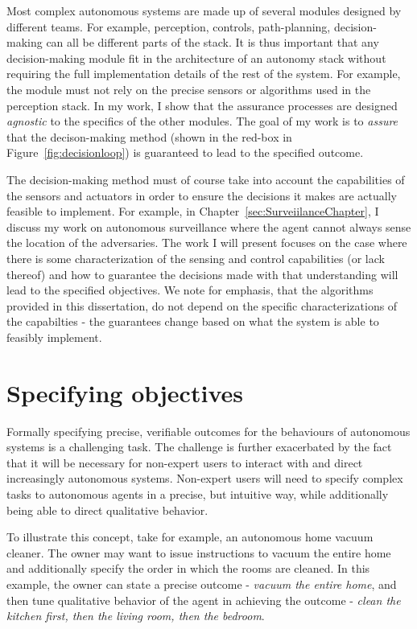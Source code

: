 Most complex autonomous systems are made up of several modules designed by different teams. For example, perception, controls, path-planning, decision-making can all be different parts of the stack. It is thus important that any decision-making module fit in the architecture of an autonomy stack without requiring the full implementation details of the rest of the system. For example, the module must not rely on the precise sensors or algorithms used in the perception stack. In my work, I show that the assurance processes are designed \emph{agnostic} to the specifics of the other modules. The goal of my work is to \emph{assure} that the decison-making method (shown in the red-box in Figure~\ref{fig:decisionloop}) is guaranteed to lead to the specified outcome.  

The decision-making method must of course take into account the capabilities of the sensors and actuators in order to ensure the decisions it makes are actually feasible to implement. For example, in Chapter~\ref{sec:SurveiilanceChapter}, I discuss my work on autonomous surveillance where the agent cannot always sense the location of the adversaries. The work I will present focuses on the case where there is some characterization of the sensing and control capabilities (or lack thereof) and how to guarantee the decisions made with that understanding will lead to the specified objectives. We note for emphasis, that the algorithms provided in this dissertation, do not depend on the specific characterizations of the capabilties - the guarantees change based on what the system is able to feasibly implement. 

\section{Specifying objectives}

Formally specifying precise, verifiable outcomes for the behaviours of autonomous systems is a challenging task. The challenge is further exacerbated by the fact that it will be necessary for non-expert users to interact with and direct increasingly autonomous systems. Non-expert users will need to specify complex tasks to autonomous agents in a precise, but intuitive way, while additionally being able to direct qualitative behavior. 

To illustrate this concept, take for example, an autonomous home vacuum cleaner. The owner may want to issue instructions to vacuum the entire home and additionally specify the order in which the rooms are cleaned. In this example, the owner can state a precise outcome - \emph{vacuum the entire home}, and then tune qualitative behavior of the agent in achieving the outcome - \emph{clean the kitchen first, then the living room, then the bedroom}. 

